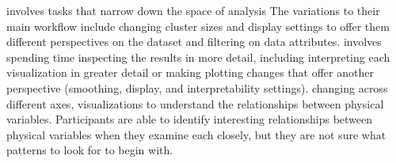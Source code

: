 involves tasks that narrow down the space of analysis
 The variations to their main workflow include changing cluster sizes and display settings to offer them different perspectives on the dataset and filtering on data attributes.
 involves spending time inspecting the results in more detail, including interpreting each visualization in greater detail or making plotting changes that offer another perspective (smoothing, display, and interpretability settings).
changing across different axes, 
visualizations to understand the relationships between physical variables. Participants are able to identify interesting relationships between physical variables when they examine each closely, but they are not sure what patterns to look for to begin with. 


